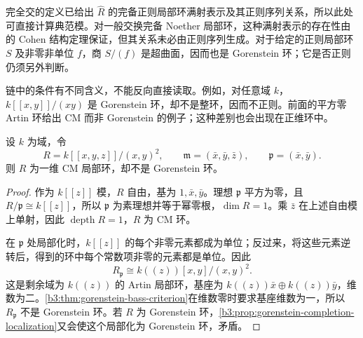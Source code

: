 完全交的定义已给出 \(\widehat R\) 的完备正则局部环满射表示及其正则序列关系，所以此处可直接计算典范模。对一般交换完备 Noether 局部环，这种满射表示的存在性由的 Cohen 结构定理保证，但其关系未必由正则序列生成。对于给定的正则局部环 \(S\) 及非零非单位 \(f\)，商 \(S/(f)\) 是超曲面，因而也是 Gorenstein 环；它是否正则仍须另外判断。

\ProseParagraphBreak
链中的条件有不同含义，不能反向直接读取。例如，对任意域 \(k\)，\(k[\![x,y]\!]/(xy)\) 是 Gorenstein 环，却不是整环，因而不正则。前面的平方零 Artin 环给出 CM 而非 Gorenstein 的例子；这种差别也会出现在正维环中。

\begin{example}\label{b3:exm:positive-dimensional-cm-not-gorenstein}
	设 \(k\) 为域，令
	\[
		R=k[\![x,y,z]\!]/(x,y)^2, \qquad \mathfrak m=(\bar x,\bar y,\bar z), \qquad \mathfrak p=(\bar x,\bar y).
	\]
	则 \(R\) 为一维 CM 局部环，却不是 Gorenstein 环。
\end{example}
\begin{proof}
	作为 \(k[\![z]\!]\) 模，\(R\) 自由，基为 \(1,\bar x,\bar y\)。理想 \(\mathfrak p\) 平方为零，且 \(R/\mathfrak p\cong k[\![z]\!]\)，所以 \(\mathfrak p\) 为素理想并等于幂零根，\(\dim R=1\)。乘 \(\bar z\) 在上述自由模上单射，因此 \(\operatorname{depth}R=1\)，\(R\) 为 CM 环。

	在 \(\mathfrak p\) 处局部化时，\(k[\![z]\!]\) 的每个非零元素都成为单位；反过来，将这些元素逆转后，得到的环中每个常数项非零的元素都是单位。因此
	\[
		R_{\mathfrak p}\cong k(\!(z)\!)[x,y]/(x,y)^2.
	\]
	这是剩余域为 \(k(\!(z)\!)\) 的 Artin 局部环，基座为 \(k(\!(z)\!)\bar x\oplus k(\!(z)\!)\bar y\)，维数为二。\cref{b3:thm:gorenstein-bass-criterion}在维数零时要求基座维数为一，所以 \(R_{\mathfrak p}\) 不是 Gorenstein 环。若 \(R\) 为 Gorenstein 环，\cref{b3:prop:gorenstein-completion-localization}又会使这个局部化为 Gorenstein 环，矛盾。
\end{proof}
